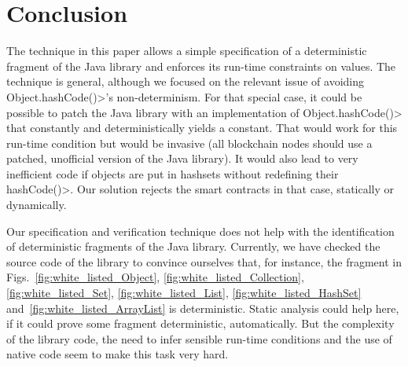\section{Conclusion}\label{sec:conclusion}

The technique in this paper allows a simple
specification of a deterministic fragment of the Java library and
enforces its run-time constraints on values.
The technique is general, although we focused on the
relevant issue of avoiding \<Object.hashCode()>'s non-determinism.
For that special case, it could be possible to patch the Java library
with an implementation of \<Object.hashCode()> that constantly and
deterministically yields a constant. That would work for this run-time condition
but would be invasive (all blockchain nodes should use a patched,
unofficial version of the Java library). It would also lead to very inefficient
code if objects are put in hashsets without redefining their \<hashCode()>.
Our solution rejects the smart contracts in that case, statically or dynamically.

Our specification and verification technique does not help with the
identification of deterministic fragments of the Java library. Currently,
we have checked the source code of the library to convince ourselves that,
for instance, the fragment in Figs.~\ref{fig:white_listed_Object}, \ref{fig:white_listed_Collection},
\ref{fig:white_listed_Set}, \ref{fig:white_listed_List},
\ref{fig:white_listed_HashSet} and~\ref{fig:white_listed_ArrayList} is deterministic.
Static analysis could help here, if it could prove some fragment deterministic,
automatically. But the complexity of the library code, the need to infer
sensible run-time conditions and the use of native code seem to make this task very hard.
